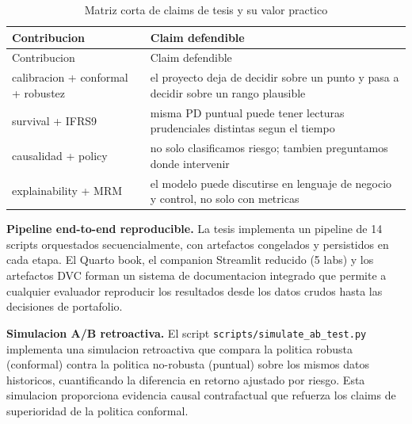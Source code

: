 \documentclass[
  spanish,
  11pt,
  letterpaper,
]{scrbook}
\theoremstyle{plain}
\theoremstyle{remark}
\begin{document}
\begin{longtable}[]{@{}
  >{\raggedright\arraybackslash}p{}
  >{\raggedright\arraybackslash}p{}@{}}
\caption{Matriz corta de claims de tesis y su valor
practico}\label{tbl-thesis-claims}\tabularnewline
\toprule\noalign{}
\begin{minipage}[b]{\linewidth}\raggedright
Contribucion
\end{minipage} & \begin{minipage}[b]{\linewidth}\raggedright
Claim defendible
\end{minipage} \\
\midrule\noalign{}
\endfirsthead
\toprule\noalign{}
\begin{minipage}[b]{\linewidth}\raggedright
Contribucion
\end{minipage} & \begin{minipage}[b]{\linewidth}\raggedright
Claim defendible
\end{minipage} \\
\midrule\noalign{}
\endhead
\bottomrule\noalign{}
\endlastfoot
calibracion + conformal + robustez & el proyecto deja de decidir sobre
un punto y pasa a decidir sobre un rango plausible \\
survival + IFRS9 & misma PD puntual puede tener lecturas prudenciales
distintas segun el tiempo \\
causalidad + policy & no solo clasificamos riesgo; tambien preguntamos
donde intervenir \\
explainability + MRM & el modelo puede discutirse en lenguaje de negocio
y control, no solo con metricas \\
\end{longtable}

\textbf{Pipeline end-to-end reproducible.} La tesis implementa un
pipeline de 14 scripts orquestados secuencialmente, con artefactos
congelados y persistidos en cada etapa. El Quarto book, el companion
Streamlit reducido (5 labs) y los artefactos DVC forman un sistema de
documentacion integrado que permite a cualquier evaluador reproducir los
resultados desde los datos crudos hasta las decisiones de portafolio.

\textbf{Simulacion A/B retroactiva.} El script
\texttt{scripts/simulate\_ab\_test.py} implementa una simulacion
retroactiva que compara la politica robusta (conformal) contra la
politica no-robusta (puntual) sobre los mismos datos historicos,
cuantificando la diferencia en retorno ajustado por riesgo. Esta
simulacion proporciona evidencia causal contrafactual que refuerza los
claims de superioridad de la politica conformal.
\end{document}
